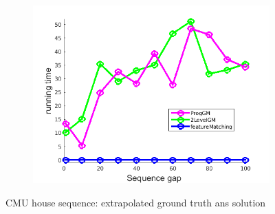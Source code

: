 \documentclass[
	fontsize=12pt,
	paper=a4,
	twoside=false,
	numbers=noenddot,
	plainheadsepline,
	toc=listof,
	toc=bibliography
]{scrartcl}
\begin{document}
\begin{figure}[h]
\begin{subfigure}[b]{0.3\textwidth}
		\includegraphics[scale=0.25]{"fig_ver2608/RealImages/HouseSeq/anchor_descr/using_cpd_afftrafo/ext_solution/performance/time"}  
	\end{subfigure} 	
	\caption{CMU house sequence: extrapolated ground truth ans solution}
\end{figure}
\vspace{-20pt}
\end{document}
